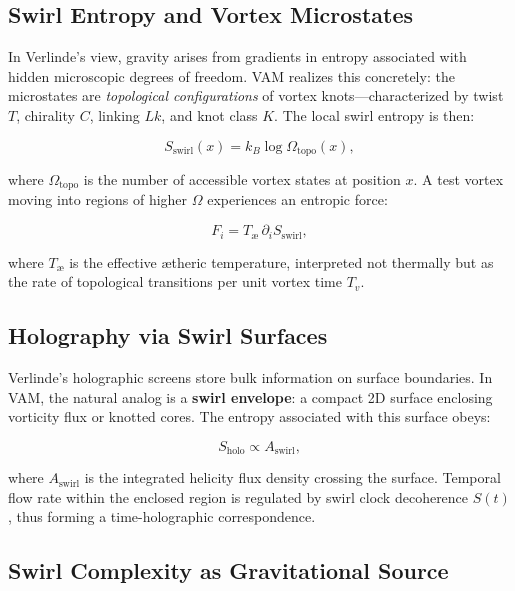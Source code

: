 \documentclass[12pt]{article}
\begin{document}
\subsection*{Swirl Entropy and Vortex Microstates}

In Verlinde’s view, gravity arises from gradients in entropy associated with hidden microscopic degrees of freedom. VAM realizes this concretely: the microstates are \emph{topological configurations} of vortex knots—characterized by twist \( T \), chirality \( C \), linking \( Lk \), and knot class \( K \). The local swirl entropy is then:

\begin{equation}
S_{\text{swirl}}(x) = k_B \log \Omega_{\text{topo}}(x),
\end{equation}

where \( \Omega_{\text{topo}} \) is the number of accessible vortex states at position \( x \). A test vortex moving into regions of higher \( \Omega \) experiences an entropic force:

\begin{equation}
F_i = T_{\text{æ}} \, \partial_i S_{\text{swirl}},
\end{equation}

where \( T_{\text{æ}} \) is the effective \ae{}theric temperature, interpreted not thermally but as the rate of topological transitions per unit vortex time \( T_v \).

\subsection*{Holography via Swirl Surfaces}

Verlinde’s holographic screens store bulk information on surface boundaries. In VAM, the natural analog is a \textbf{swirl envelope}: a compact 2D surface enclosing vorticity flux or knotted cores. The entropy associated with this surface obeys:

\begin{equation}
S_{\text{holo}} \propto A_{\text{swirl}},
\end{equation}

where \( A_{\text{swirl}} \) is the integrated helicity flux density crossing the surface. Temporal flow rate within the enclosed region is regulated by swirl clock decoherence \( S(t) \), thus forming a time-holographic correspondence.

\subsection*{Swirl Complexity as Gravitational Source}
\end{document}
